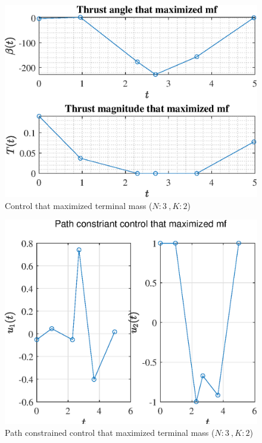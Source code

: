 \documentclass[]{article}
\begin{document}
	\begin{figure}
		\centering
		\includegraphics[scale=0.75]{control_N3_K2_C3_mf.eps}
		\caption{Control that maximized terminal mass (\(N:3\ , K:2\))}
		\label{fig:control_N3_K2_C3_mf}
	\end{figure}
	\begin{figure}
		\centering
		\includegraphics[scale=0.75]{path_N3_K2_C3_mf.eps}
		\caption{Path constrained control that maximized terminal mass (\(N:3\ , K:2\))}
		\label{fig:path_N3_K2_C3_mf}
	\end{figure}
\end{document}
